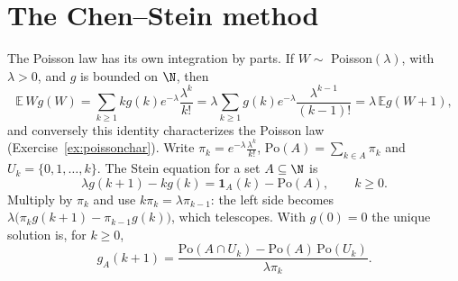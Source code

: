 \section{The Chen--Stein method}

The Poisson law has its own integration by parts. If $W\sim$ Poisson$(\lambda)$, with $\lambda>0$, and $g$ is bounded on $\N$, then
\[
\mathbb E\,Wg(W)=\sum_{k\ge1}kg(k)e^{-\lambda}\frac{\lambda^k}{k!}=\lambda\sum_{k\ge1}g(k)e^{-\lambda}\frac{\lambda^{k-1}}{(k-1)!}=\lambda\,\mathbb Eg(W+1),
\]
and conversely this identity characterizes the Poisson law (Exercise~\ref{ex:poissonchar}). Write $\pi_k=e^{-\lambda}\frac{\lambda^k}{k!}$, $\mathrm{Po}(A)=\sum_{k\in A}\pi_k$ and
$U_k=\{0,1,\dots,k\}$. The Stein equation for a set $A\subseteq\N$ is
\begin{equation}\label{eq:chensteineq}
\lambda g(k+1)-kg(k)=\mathbf 1_A(k)-\mathrm{Po}(A),\qquad k\ge0.
\end{equation}
Multiply by $\pi_k$ and use $k\pi_k=\lambda\pi_{k-1}$: the left side becomes $\lambda\bigl(\pi_kg(k+1)-\pi_{k-1}g(k)\bigr)$, which telescopes. With $g(0)=0$ the
unique solution is, for $k\ge0$,
\begin{equation}\label{eq:chensteinsol}
g_A(k+1)=\frac{\mathrm{Po}(A\cap U_k)-\mathrm{Po}(A)\,\mathrm{Po}(U_k)}{\lambda\pi_k}.
\end{equation}

